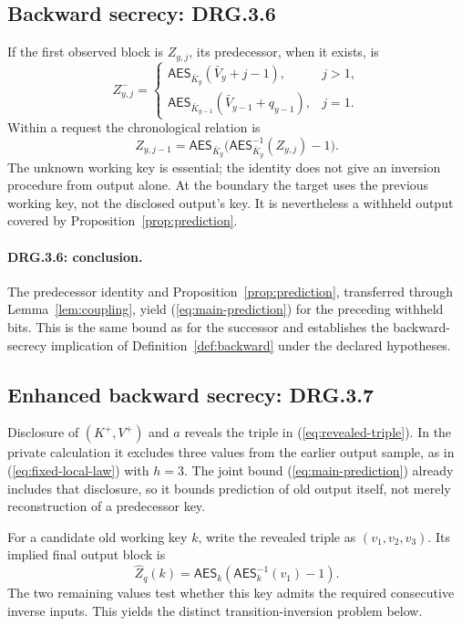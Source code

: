 \documentclass[journal=tosc,preprint,floatrow,nohyperxmp]{iacrtrans}
\numberwithin{lemma}{section}
\numberwithin{proposition}{section}
\newcommand{\Enc}{\mathsf{AES}}
\numberwithin{equation}{section}
\theoremstyle{definition}
\numberwithin{definition}{section}
\theoremstyle{plain}
\begin{document}
\subsection{Backward secrecy: DRG.3.6}
If the first observed block is $Z_{y,j}$, its predecessor, when it exists, is
\begin{equation}
 Z^-_{y,j}=\begin{cases}
 \Enc_{\bar K_y}(\bar V_y+j-1),&j>1,\\
 \Enc_{\bar K_{y-1}}(\bar V_{y-1}+q_{y-1}),&j=1.
 \end{cases}\label{eq:predecessor-cases}
\end{equation}
Within a request the chronological relation is
\[
 Z_{y,j-1}=\Enc_{\bar K_y}\bigl(\Enc_{\bar K_y}^{-1}(Z_{y,j})-1\bigr).
\]
The unknown working key is essential; the identity does not give an inversion procedure from output alone. At the boundary the target uses the previous working key, not the disclosed output's key. It is nevertheless a withheld output covered by Proposition~\ref{prop:prediction}.

\paragraph{DRG.3.6: conclusion.}
The predecessor identity and Proposition~\ref{prop:prediction}, transferred through Lemma~\ref{lem:coupling}, yield (\ref{eq:main-prediction}) for the preceding withheld bits. This is the same bound as for the successor and establishes the backward-secrecy implication of Definition~\ref{def:backward} under the declared hypotheses.

\subsection{Enhanced backward secrecy: DRG.3.7}\label{sec:enhanced}
Disclosure of $(K^+,V^+)$ and $a$ reveals the triple in (\ref{eq:revealed-triple}). In the private calculation it excludes three values from the earlier output sample, as in (\ref{eq:fixed-local-law}) with $h=3$. The joint bound (\ref{eq:main-prediction}) already includes that disclosure, so it bounds prediction of old output itself, not merely reconstruction of a predecessor key.

For a candidate old working key $k$, write the revealed triple as $(v_1,v_2,v_3)$. Its implied final output block is
\begin{equation}
 \widehat Z_q(k)=\Enc_k(\Enc_k^{-1}(v_1)-1).
 \label{eq:candidate-last-output}
\end{equation}
The two remaining values test whether this key admits the required consecutive inverse inputs. This yields the distinct transition-inversion problem below.
\end{document}
